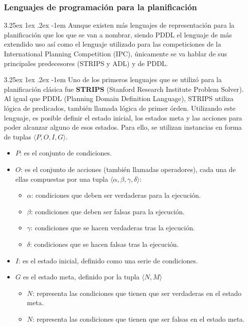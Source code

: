 \documentclass{article}
\makeatletter
\newcounter{subsubsubsection}
\renewcommand\paragraph{\@startsection{paragraph}{5}{\z@}%
  {3.25ex \@plus1ex \@minus.2ex}%
  {-1em}%
  {\normalfont\normalsize\bfseries}}
\makeatother
\begin{document}
        \subsubsection{Lenguajes de programación para la planificación}


\paragraph{}
Aunque existen más lenguajes de representación para la planificación que los que se van a nombrar, siendo PDDL el lenguaje de más extendido uso así como el lenguaje utilizado para las competiciones de la International Planning Competition (IPC), únicamente se va hablar de sus principales predecesores (STRIPS y ADL) y de PDDL.




\paragraph{}            
Uno de los primeros lenguajes que se utilizó para la planificación clásica fue \textbf{STRIPS} (Stanford Research Institute Problem Solver)\cite{strips}. Al igual que PDDL (Planning Domain Definition Language), STRIPS utiliza lógica de predicados, también llamada lógica de primer órden. Utilizando este lenguaje, es posible definir el estado inicial, los estados meta y las acciones para poder alcanzar alguno de esos estados. Para ello, se utilizan instancias en forma de tuplas $\langle P, O, I, G \rangle$.
\begin{itemize}
    \item $P$: es el conjunto de condiciones.
    \item $O$: es el conjunto de acciones (también llamadas operadores), cada una de ellas compuestas por una tupla $\langle \alpha, \beta, \gamma, \delta \rangle$:
    \begin{itemize}
        \item $\alpha$: condiciones que deben ser verdaderas para la ejecución.
        \item $\beta$: condiciones que deben ser falsas para la ejecución.
        \item $\gamma$: condiciones que se hacen verdaderas tras la ejecución.
        \item $\delta$: condiciones que se hacen falsas tras la ejecución.
    \end{itemize}
    \item $I$: es el estado inicial, definido como una serie de condiciones.
    \item $G$ es el estado meta, definido por la tupla $\langle N, M \rangle$
    \begin{itemize}
        \item $N$: representa las condiciones que tienen que ser verdaderas en el estado meta.
        \item $N$: representa las condiciones que tienen que ser falsas en el estado meta.
    \end{itemize}
\end{itemize}
\end{document}
